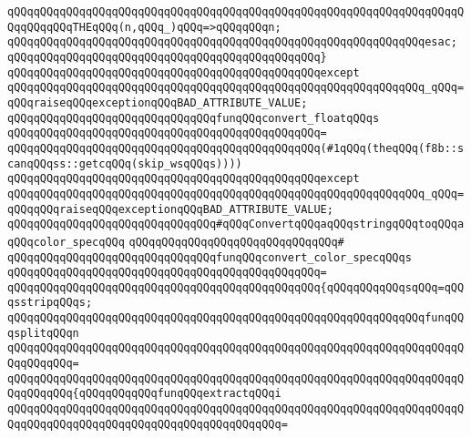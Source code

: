 \verb|qQQqqQQqqQQqqQQqqQQqqQQqqQQqqQQqqQQqqQQqqQQqqQQqqQQqqQQqqQQqqQQqqQQqqQQqqQQqqQQqTHEqQQq(n,qQQq_)qQQq=>qQQqqQQqn;|\newline
\verb|qQQqqQQqqQQqqQQqqQQqqQQqqQQqqQQqqQQqqQQqqQQqqQQqqQQqqQQqqQQqqQQqesac;|\newline
\verb|qQQqqQQqqQQqqQQqqQQqqQQqqQQqqQQqqQQqqQQqqQQqqQQq}|\newline
\verb|qQQqqQQqqQQqqQQqqQQqqQQqqQQqqQQqqQQqqQQqqQQqqQQqexcept|\newline
\verb|qQQqqQQqqQQqqQQqqQQqqQQqqQQqqQQqqQQqqQQqqQQqqQQqqQQqqQQqqQQqqQQq_qQQq=qQQqraiseqQQqexceptionqQQqBAD_ATTRIBUTE_VALUE;|\newline
\newline
\verb|qQQqqQQqqQQqqQQqqQQqqQQqqQQqqQQqfunqQQqconvert_floatqQQqs|\newline
\verb|qQQqqQQqqQQqqQQqqQQqqQQqqQQqqQQqqQQqqQQqqQQqqQQq=|\newline
\verb|qQQqqQQqqQQqqQQqqQQqqQQqqQQqqQQqqQQqqQQqqQQqqQQq(#1qQQq(theqQQq(f8b::scanqQQqss::getcqQQq(skip_wsqQQqs))))|\newline
\verb|qQQqqQQqqQQqqQQqqQQqqQQqqQQqqQQqqQQqqQQqqQQqqQQqexcept|\newline
\verb|qQQqqQQqqQQqqQQqqQQqqQQqqQQqqQQqqQQqqQQqqQQqqQQqqQQqqQQqqQQqqQQq_qQQq=qQQqqQQqraiseqQQqexceptionqQQqBAD_ATTRIBUTE_VALUE;|\newline
\newline
\verb|qQQqqQQqqQQqqQQqqQQqqQQqqQQqqQQq#qQQqConvertqQQqaqQQqstringqQQqtoqQQqaqQQqcolor_specqQQq|\newline
\verb|qQQqqQQqqQQqqQQqqQQqqQQqqQQqqQQq#|\newline
\verb|qQQqqQQqqQQqqQQqqQQqqQQqqQQqqQQqfunqQQqconvert_color_specqQQqs|\newline
\verb|qQQqqQQqqQQqqQQqqQQqqQQqqQQqqQQqqQQqqQQqqQQqqQQq=|\newline
\verb|qQQqqQQqqQQqqQQqqQQqqQQqqQQqqQQqqQQqqQQqqQQqqQQq{qQQqqQQqqQQqsqQQq=qQQqsstripqQQqs;|\newline
\newline
\verb|qQQqqQQqqQQqqQQqqQQqqQQqqQQqqQQqqQQqqQQqqQQqqQQqqQQqqQQqqQQqqQQqfunqQQqsplitqQQqn|\newline
\verb|qQQqqQQqqQQqqQQqqQQqqQQqqQQqqQQqqQQqqQQqqQQqqQQqqQQqqQQqqQQqqQQqqQQqqQQqqQQqqQQq=|\newline
\verb|qQQqqQQqqQQqqQQqqQQqqQQqqQQqqQQqqQQqqQQqqQQqqQQqqQQqqQQqqQQqqQQqqQQqqQQqqQQqqQQq{qQQqqQQqqQQqfunqQQqextractqQQqi|\newline
\verb|qQQqqQQqqQQqqQQqqQQqqQQqqQQqqQQqqQQqqQQqqQQqqQQqqQQqqQQqqQQqqQQqqQQqqQQqqQQqqQQqqQQqqQQqqQQqqQQqqQQqqQQqqQQqqQQq=|\newline
